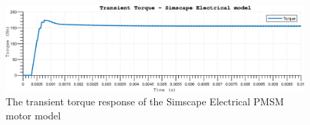 \begin{figure}[htb]
\begingroup
\tikzset{}
 \centerline{\includegraphics[width=1\columnwidth]{.//Figure/EPS/PE_torque.eps}}
 \endgroup
 \caption{The transient torque response of the Simscape Electrical PMSM motor model}
 \label{fig:pe_torque_trans}
\end{figure}
